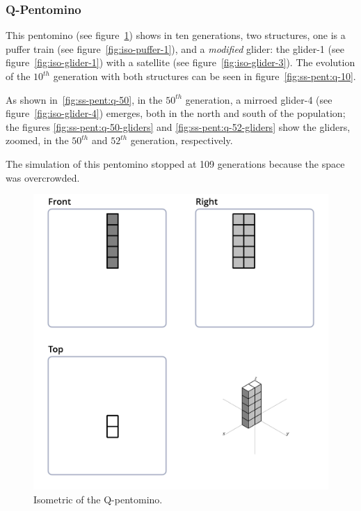 \subsubsection{Q-Pentomino}
\label{sec:q-pentomino}
This pentomino (see figure~\ref{fig:iso-pent-q}) shows in ten generations, two
structures, one is a puffer train (see figure~\ref{fig:iso-puffer-1}), and a
\textit{modified} glider: the glider-1 (see figure~\ref{fig:iso-glider-1}) with
a satellite (see figure~\ref{fig:iso-glider-3}). The evolution of the $10^{th}$
generation with both structures can be seen in figure~\ref{fig:ss-pent:q-10}.

As shown in~\ref{fig:ss-pent:q-50}, in the $50^{th}$ generation, a mirroed
glider-4 (see figure~\ref{fig:iso-glider-4}) emerges, both in the north and
south of the population; the figures \ref{fig:ss-pent:q-50-gliders} and
\ref{fig:ss-pent:q-52-gliders} show the gliders, zoomed, in the $50^{th}$ and
$52^{th}$ generation, respectively.

The simulation of this pentomino stopped at 109 generations because the space
was overcrowded.


\begin{figure}
	\centering
	\includegraphics[scale=0.3]{iso_diagrams/o.png}
	\caption{Isometric of the Q-pentomino.}
  \label{fig:iso-pent-q}
\end{figure}

